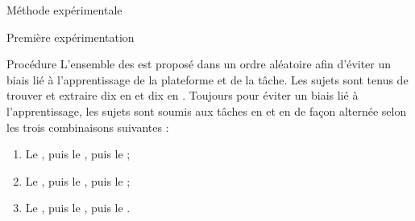\documentclass[myfrancais,ngerman,english,frenchb]{mythesis}
\begin{document}
\begin{mychapter}{Méthode expérimentale}
\begin{mysection}{Première expérimentation}
\begin{mysubsection}{Procédure}
				L'ensemble des  est proposé dans un ordre aléatoire afin d'éviter un biais lié à l'apprentissage de la plateforme et de la tâche.
				Les sujets sont tenus de trouver et extraire dix  en  et dix  en .
				Toujours pour éviter un biais lié à l'apprentissage, les sujets sont soumis aux tâches en  et en  de façon alternée selon les trois combinaisons suivantes :
				\begin{enumerate}
					\item Le  , puis le  , puis le  ;
					\item Le  , puis le  , puis le  ;
					\item Le  , puis le  , puis le  .
				\end{enumerate}


\end{mysubsection}
\end{mysection}
\end{mychapter}
\end{document}
